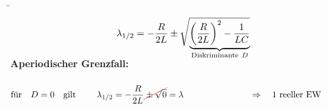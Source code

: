 \begin{frame}[t]\ftx{\subsubsecname}
\b{%
\begin{minipage}{\textwidth}\centering
    \begin{minipage}[t][3cm][]{0.48\textwidth}\centering
    \end{minipage}%
    \begin{minipage}[t][3cm][]{0.48\textwidth}\centering
        \begin{align*}
            \lambda_{1/2} = -\frac{R}{2L} \pm \sqrt{
                \smash{\underbrace{%
                \left(\frac{R}{2L}\right)^2 - \frac{1}{LC}
                }_{\mathclap{\text{Diskriminante}\ D}}}
                \vphantom{\left(\frac{R}{2L}\right)^2 - \frac{1}{LC}}%
            }%
        \end{align*}
    \end{minipage}
\end{minipage}\vspace{2pt}
    \textbf{Aperiodischer Grenzfall:}
}%
\ifvmode\vspace*{-\baselineskip}\setlength{\parskip}{4pt}\fi%
\begin{align*}
    \vphantom{\sqrt{\left(\frac{R}{2L}\right)^2}}
    &\text{für}\quad D = 0 \quad\text{gilt}&
        \lambda_{1/2} &= -\frac{R}{2L} \redcancel{ {} \pm {} \sqrt{0}} = \lambda
            &&\Rightarrow\quad \text{1 reeller EW}
    \\[-15pt] &\hphantom{1rrrrrrrrrrrrrrrr} &   \hphantom{2llllll}&\hphantom{\mathrel{\phantom{=}}2rrrrrrrrrrrrrrrrrrrrrrrrrrr}     &&\hphantom{3rrrrrrrrrrrrrrrrrrrrrrrr} \nonumber

\end{align*}
\end{frame}
